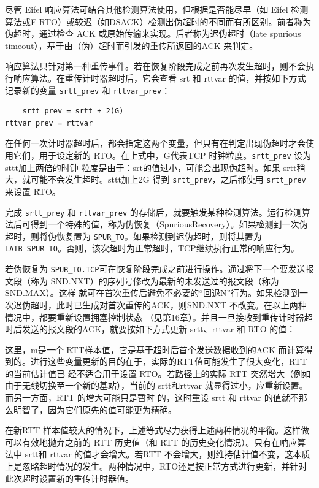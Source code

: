 尽管 Eifel 响应算法可结合其他检测算法使用，但根据是否能尽早（如 Eifel
检测算法或F-RTO）或较迟（如DSACK）检测出伪超时的不同而有所区别。前者称为伪超时，通过检查
ACK 或原始传输来实现。后者称为迟伪超时（late spurious timeout），基于由（伪）超时而引发的重传所返回的ACK 来判定。

响应算法只针对第一种重传事件。若在恢复阶段完成之前再次发生超时，则不会执行响应算法。在重传计时器超时后，它会查看 srt 和 rttvar
的值，并按如下方式记录新的变量
\verb|srtt_prev| 和 \verb|rttvar_prev|：

\begin{verbatim}
    srtt_prev = srtt + 2(G)
rttvar prev = rttvar
\end{verbatim}

在任何一次计时器超时后，都会指定这两个变量，但只有在判定出现伪超时才会使用它们，用于设定新的 RTO。在上式中，G代表TCP
时钟粒度。\verb|srtt_prev| 设为 sttt加上两倍的时钟
粒度是由于：srt的值过小，可能会出现伪超时。如果 srtt稍大，就可能不会发生超时。sttt加上2G 得到
\verb|srtt_prev|，之后都使用 \verb|srtt_prev| 来设置 RTO。

完成 \verb|srtt_prey| 和 \verb|rttvar_prev|
的存储后，就要触发某种检测算法。运行检测算法后可得到一个特殊的值，称为伪恢复（SpuriousRecovery）。如果检测到一次伪超时，则将伪恢复置为
\verb|SPUR_TO|。如果检测到迟伪超时，则将其置为 \verb|LATB_SPUR_TO|。否则，该次超时为正常超时，TCP继续执行正常的响应行为。

若伪恢复为 \verb|SPUR_TO.TCP|可在恢复阶段完成之前进行操作。通过将下一个要发送报文段（称为
SND.NXT）的序列号修改为最新的未发送过的报文段（称为 SND.MAX）。这样
就可在首次重传后避免不必要的“回退N”行为。如果检测到一次迟伪超时，此时已生成对首次重传的ACK，则SND.NXT
不改变。在以上两种情况中，都要重新设置拥塞控制状态
（见第16章）。并且一旦接收到重传计时器超时后发送的报文段的ACK，就要按如下方式更新 srtt、rttvar 和 RTO 的值：

这里，m是一个 RTT样本值，它是基于超时后首个发送数据收到的ACK
而计算得到的。进行这些变量更新的目的在于，实际的RTT值可能发生了很大变化，RTT 的当前估计值已
经不适合用于设置 RTO。若路径上的实际 RTT 突然增大（例如由于无线切换至一个新的基站），当前的 srtt和rttvar
就显得过小，应重新设置。而另一方面，RTT 的增大可能只是暂时
的，这时重设 srtt 和 rttvar 的值就不那么明智了，因为它们原先的值可能更为精确。

在新RTT 样本值较大的情况下，上述等式尽力获得上述两种情况的平衡。这样做可以有效地抛弃之前的 RTT 历史值（和 RTT
的历史变化情况）。只有在响应算法中 srtt和 rttvar
的值才会增大。若RTT 不会增大，则维持估计值不变，这本质上是忽略超时情况的发生。两种情况中，RTO还是按正常方式进行更新，并针对此次超时设置新的重传计时器值。

